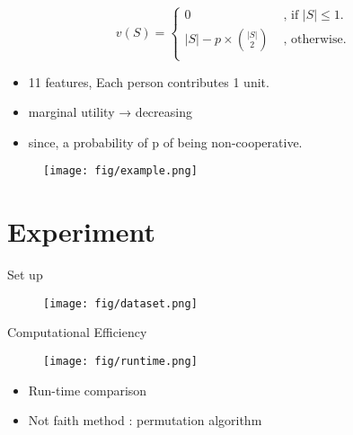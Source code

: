 \documentclass[10pt]{beamer}
\newcommand{\f}{v}
\begin{document}
\begin{frame}
    \begin{equation}
    \label{eqn:example1}
    \f(S) = 
    \begin{cases}
    0  & \text{ , if } |S| \leq 1. \\
    |S| - p \times { |S| \choose 2 }  & \text{ , otherwise.} \\
    \end{cases}
    \tag{18}
\end{equation}
\vspace{2em}
\begin{itemize}[label=\scalebox{0.5}{$\blacksquare$}]
    \item 11 features, Each person contributes 1 unit.
    \item marginal utility → decreasing
    \item since, a probability of p of being non-cooperative.
\end{itemize}
\end{frame}
\begin{frame}

    \begin{figure}[h]
        \centering
        \texttt{[image: fig/example.png]}
    \end{figure}
\end{frame}

\section[Experiment]{Experiment}
\begin{frame}{Set up}
    \begin{figure}
        \centering
        \texttt{[image: fig/dataset.png]}
    \end{figure}
\end{frame}
\begin{frame}{Computational Efficiency}
    \begin{figure}
    \centering
    \texttt{[image: fig/runtime.png]}
    \end{figure}
    \begin{itemize}[label=\scalebox{0.5}{$\blacksquare$}]
        \item Run-time comparison
        \item Not faith method : permutation algorithm
    \end{itemize}
\end{frame}
\end{document}
